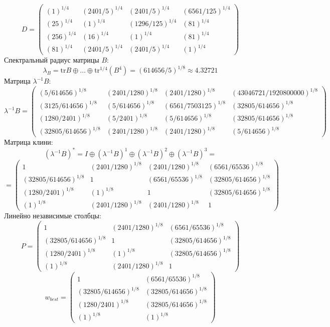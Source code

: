 $$D = \begin{pmatrix}
(1)^{1/4} & (2401/5)^{1/4} & (2401/5)^{1/4} & (6561/125)^{1/4}\\
(25)^{1/4} & (1)^{1/4} & (1296/125)^{1/4} & (81)^{1/4}\\
(256)^{1/4} & (16)^{1/4} & (1)^{1/4} & (81)^{1/4}\\
(81)^{1/4} & (2401/5)^{1/4} & (2401/5)^{1/4} & (1)^{1/4}
\end{pmatrix}
$$
Спектральный радиус матрицы $B$:
$$\lambda_{B} = \mathrm{tr}B\oplus \dots \oplus \mathrm{tr}^{1/4}(B^{4}) = (614656/5)^{1/8} \approx 4.32721$$
Матрица $\lambda^{-1}B$:
$$\lambda^{-1}B = \begin{pmatrix}
(5/614656)^{1/8} & (2401/1280)^{1/8} & (2401/1280)^{1/8} & (43046721/1920800000)^{1/8}\\
(3125/614656)^{1/8} & (5/614656)^{1/8} & (6561/7503125)^{1/8} & (32805/614656)^{1/8}\\
(1280/2401)^{1/8} & (5/2401)^{1/8} & (5/614656)^{1/8} & (32805/614656)^{1/8}\\
(32805/614656)^{1/8} & (2401/1280)^{1/8} & (2401/1280)^{1/8} & (5/614656)^{1/8}
\end{pmatrix}
$$
Матрица клини:
$$(\lambda^{-1}B)^* = I \oplus (\lambda^{-1}B)^1 \oplus (\lambda^{-1}B)^2 \oplus (\lambda^{-1}B)^3 = $$
$$ = \begin{pmatrix}
1 & (2401/1280)^{1/8} & (2401/1280)^{1/8} & (6561/65536)^{1/8}\\
(32805/614656)^{1/8} & 1 & (6561/65536)^{1/8} & (32805/614656)^{1/8}\\
(1280/2401)^{1/8} & (1)^{1/8} & 1 & (32805/614656)^{1/8}\\
(1)^{1/8} & (2401/1280)^{1/8} & (2401/1280)^{1/8} & 1
\end{pmatrix}
$$
Линейно независимые столбцы:
$$P = \begin{pmatrix}
1 & (2401/1280)^{1/8} & (6561/65536)^{1/8}\\
(32805/614656)^{1/8} & 1 & (32805/614656)^{1/8}\\
(1280/2401)^{1/8} & (1)^{1/8} & (32805/614656)^{1/8}\\
(1)^{1/8} & (2401/1280)^{1/8} & 1
\end{pmatrix}
$$
$$w_{best} = \begin{pmatrix}
1 & (6561/65536)^{1/8}\\
(32805/614656)^{1/8} & (32805/614656)^{1/8}\\
(1280/2401)^{1/8} & (32805/614656)^{1/8}\\
(1)^{1/8} & (1)^{1/8}
\end{pmatrix}
$$
